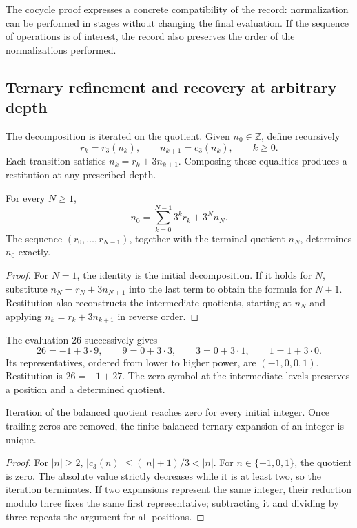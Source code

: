 The cocycle proof expresses a concrete compatibility of the record:
normalization can be performed in stages without changing the final
evaluation. If the sequence of operations is of interest, the record also preserves
the order of the normalizations performed.

\subsection{Ternary refinement and recovery at arbitrary depth}
\label{trit:refinamiento}

The decomposition is iterated on the quotient. Given \(n_0\in\mathbb Z\),
define recursively
\[
 r_k=r_3(n_k),\qquad n_{k+1}=c_3(n_k),\qquad k\ge0.
\]
Each transition satisfies \(n_k=r_k+3n_{k+1}\). Composing these
equalities produces a restitution at any prescribed depth.

\begin{proposicion}
\label{trit:prop:profundidad}
For every \(N\ge1\),
\begin{equation}
 n_0=\sum_{k=0}^{N-1}3^kr_k+3^Nn_N.
\label{trit:eq:restitucionN}
\end{equation}
The sequence \((r_0,\ldots,r_{N-1})\), together with the terminal quotient
\(n_N\), determines \(n_0\) exactly.
\end{proposicion}
\begin{proof}
For \(N=1\), the identity is the initial decomposition. If it holds for
\(N\), substitute \(n_N=r_N+3n_{N+1}\) into the last term to
obtain the formula for \(N+1\). Restitution also reconstructs the
intermediate quotients, starting at \(n_N\) and applying
\(n_k=r_k+3n_{k+1}\) in reverse order.
\end{proof}

\begin{ejemplo}
The evaluation \(26\) successively gives
\[
 26=-1+3\cdot9,\qquad 9=0+3\cdot3,
 \qquad 3=0+3\cdot1,\qquad1=1+3\cdot0.
\]
Its representatives, ordered from lower to higher power, are
\((-1,0,0,1)\). Restitution is \(26=-1+27\). The zero symbol at the
intermediate levels preserves a position and a determined quotient.
\end{ejemplo}

\begin{proposicion}
Iteration of the balanced quotient reaches zero for every initial
integer. Once trailing zeros are removed, the finite balanced ternary
expansion of an integer is unique.
\end{proposicion}
\begin{proof}
For \(|n|\ge2\),
\( |c_3(n)|\le(|n|+1)/3<|n|\).
For \(n\in\{-1,0,1\}\), the quotient is zero. The absolute value
strictly decreases while it is at least two, so the
iteration terminates. If two expansions represent the same integer,
their reduction modulo three fixes the same first representative; subtracting it
and dividing by three repeats the argument for all positions.
\end{proof}

